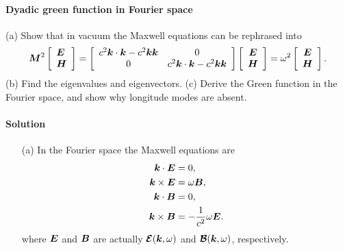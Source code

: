 \documentclass[hyperref, a4paper]{article}
\begin{document}
\paragraph{}

\paragraph{Dyadic green function in Fourier space} (a) Show that in vacuum the Maxwell equations can be rephrased 
into 
\begin{equation}
    \vb*{M}^{2}\left[\begin{array}{l}
        \vb*{E} \\
        \vb*{H}
        \end{array}\right]=\left[\begin{array}{cc}
        c^{2} \vb*{k} \cdot \vb*{k}-c^{2} \vb*{k} \vb*{k} & 0 \\
        0 & c^{2} \vb*{k} \cdot \vb*{k}-c^{2} \vb*{k} \vb*{k}
        \end{array}\right]\left[\begin{array}{c}
        \vb*{E} \\
        \vb*{H}
        \end{array}\right]=\omega^{2}\left[\begin{array}{c}
        \vb*{E} \\
        \vb*{H}
        \end{array}\right].
\end{equation}
(b) Find the eigenvalues and eigenvectors. (c) Derive the Green function in the Fourier space, 
and show why longitude modes are absent.

\paragraph{Solution} \begin{itemize}
\item[(a)] In the Fourier space the Maxwell equations are 
\[
    \begin{aligned}
        \vb*{k} \cdot \vb*{E} &= 0, \\ 
        \vb*{k} \times \vb*{E} &= \omega \vb*{B}, \\
        \vb*{k} \cdot \vb*{B} &= 0, \\
        \vb*{k} \times \vb*{B} &= - \frac{1}{c^2} \omega \vb*{E}.
    \end{aligned}
\]
where $\vb*{E}$ and $\vb*{B}$ are actually $\vb*{\mathcal{E}}(\vb*{k}, \omega)$ 
and $\vb*{\mathcal{B}}(\vb*{k}, \omega)$, respectively. 
 
\end{itemize}
\end{document}

